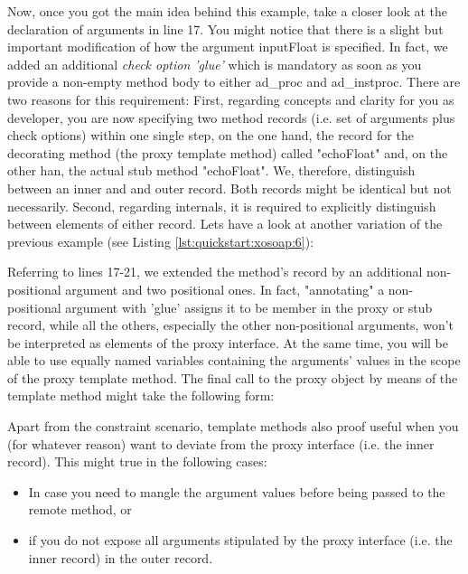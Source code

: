 Now, once you got the main idea behind this example, take a closer look  at the declaration of arguments in line 17. You might notice that there is a slight but important modification of how the argument inputFloat is specified. In fact, we added an additional \emph{check option 'glue'} which is mandatory as soon as you provide a non-empty method body to either ad\_proc and ad\_instproc. There are two reasons for this requirement: First, regarding concepts and clarity for you as developer, you are now specifying two method records (i.e. set of arguments plus check options)  within one single step, on the one hand, the record for the decorating method (the proxy template method) called "echoFloat" and, on the other han, the actual stub method "echoFloat". We, therefore, distinguish between an inner and and outer record. Both records might be identical but not necessarily. Second, regarding internals, it is required to explicitly distinguish between elements of either record. Lets have a look at another variation of the previous example (see Listing \ref{lst:quickstart:xosoap:6}):



Referring to lines 17-21, we extended the method's record by an additional non-positional argument and two positional ones. In fact, "annotating" a non-positional argument with 'glue' assigns it to be member in the proxy or stub record, while all the others, especially the other non-positional arguments, won't be interpreted as elements of the proxy interface. At the same time, you will be able to use equally named variables containing the arguments' values in the scope of the proxy template method. The final call to the proxy object by means of the template method might take the following form:



Apart from the constraint scenario, template methods also proof useful when you (for whatever reason) want to deviate from the proxy interface (i.e. the inner record). This might true in the following cases:
\begin{itemize}
\item In case you need to mangle the argument values before being passed to the remote method, or
\item if you do not expose all arguments stipulated by the proxy interface (i.e. the inner record) in the outer record.
\end{itemize}

